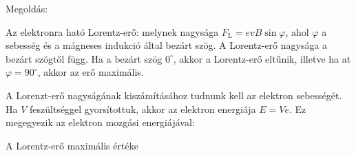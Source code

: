 
\ifdefined\megoldas

 Megoldás: 

 Az elektronra ható Lorentz-erő:
 melynek nagysága $F_\text{L}=e vB\sin\varphi$, ahol $\varphi$ a sebesség és a mágneses indukció által bezárt szög. A Lorentz-erő nagysága a bezárt szögtől függ. Ha a bezárt szög $0^\circ$, akkor a Lorentz-erő eltűnik, illetve ha at $\varphi=90^\circ$, akkor az erő maximális. 

 A Lorenzt-erő nagyságának kiszámításához tudnunk kell az elektron sebességét. Ha $V$ feszültséggel gyorsítottuk, akkor az elektron energiája $E=Ve$. Ez megegyezik az elektron mozgási energiájával: 

 A Lorentz-erő maximális értéke

\fi